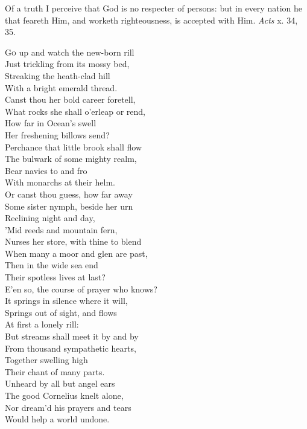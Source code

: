 Of a truth I perceive that God is no respecter of persons: but in every nation he that feareth Him, and worketh righteousness, is accepted with Him. \emph{Acts} x. 34, 35.

\textsc{Go} up and watch the new-born rill \\
 Just trickling from its mossy bed, \\
 Streaking the heath-clad hill \\
 With a bright emerald thread. \\
  Canst thou her bold career foretell, \\
 What rocks she shall o’erleap or rend, \\
 How far in Ocean’s swell \\
 Her freshening billows send? \\
  Perchance that little brook shall flow \\
 The bulwark of some mighty realm, \\
 Bear navies to and fro \\
 With monarchs at their helm. \\
  Or canst thou guess, how far away \\
 Some sister nymph, beside her urn \\
 Reclining night and day, \\
 ’Mid reeds and mountain fern, \\
  Nurses her store, with thine to blend \\
 When many a moor and glen are past, \\
 Then in the wide sea end \\
 Their spotless lives at last? \\
  E’en so, the course of prayer who knows? \\
 It springs in silence where it will, \\
 Springs out of sight, and flows \\
 At first a lonely rill: \\
  But streams shall meet it by and by \\
 From thousand sympathetic hearts, \\
 Together swelling high \\
 Their chant of many parts. \\
  Unheard by all but angel ears \\
 The good Cornelius knelt alone, \\
 Nor dream’d his prayers and tears \\
 Would help a world undone. \\
